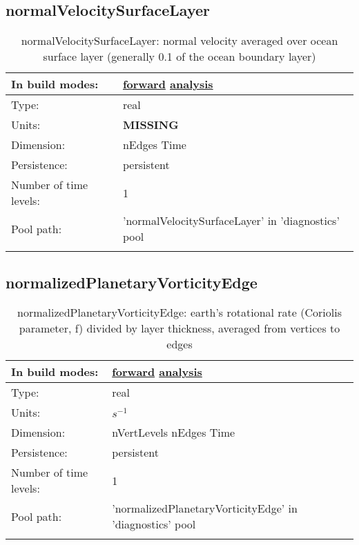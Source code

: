 \subsection[normalVelocitySurfaceLayer]{normalVelocitySurfaceLayer}
\label{subsec:var_sec_diagnostics_normalVelocitySurfaceLayer}
\begin{center}
\begin{longtable}{| p{2.0in} | p{4.0in} |}
        \hline 
        In build modes: & \hyperref[subsec:forward_var_tab_diagnostics]{forward} \hyperref[subsec:analysis_var_tab_diagnostics]{analysis} \\
        \hline 
        Type: & real \\
        \hline 
        Units: & {\bf \color{red} MISSING} \\
        \hline 
        Dimension: & nEdges Time \\
        \hline 
        Persistence: & persistent \\
        \hline 
        Number of time levels: & 1 \\
        \hline 
            Pool path: & 'normalVelocitySurfaceLayer' in 'diagnostics' pool
 \\
		 \hline 
    \caption{normalVelocitySurfaceLayer: normal velocity averaged over ocean surface layer (generally 0.1 of the ocean boundary layer)}
\end{longtable}
\end{center}
\subsection[normalizedPlanetaryVorticityEdge]{normalizedPlanetaryVorticityEdge}
\label{subsec:var_sec_diagnostics_normalizedPlanetaryVorticityEdge}
\begin{center}
\begin{longtable}{| p{2.0in} | p{4.0in} |}
        \hline 
        In build modes: & \hyperref[subsec:forward_var_tab_diagnostics]{forward} \hyperref[subsec:analysis_var_tab_diagnostics]{analysis} \\
        \hline 
        Type: & real \\
        \hline 
        Units: & $s^{-1}$ \\
        \hline 
        Dimension: & nVertLevels nEdges Time \\
        \hline 
        Persistence: & persistent \\
        \hline 
        Number of time levels: & 1 \\
        \hline 
            Pool path: & 'normalizedPlanetaryVorticityEdge' in 'diagnostics' pool
 \\
		 \hline 
    \caption{normalizedPlanetaryVorticityEdge: earth's rotational rate (Coriolis parameter, f) divided by layer thickness, averaged from vertices to edges}
\end{longtable}
\end{center}
